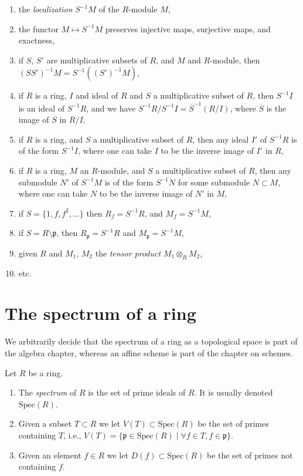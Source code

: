\begin{enumerate}
\label{localization-localization}
\item the {\it localization} $S^{-1}M$ of the $R$-module $M$,
\label{localization-module}
\item the functor $M \mapsto S^{-1}M$ preserves injective maps,
surjective maps, and exactness,
\label{localization-exact}
\item if $S$, $S'$ are multiplicative subsets of $R$,
and $M$ and $R$-module, then $(SS')^{-1}M =
S^{-1}((S')^{-1}M)$,
\label{localization-localization-module}
\item if $R$ is a ring, $I$ and ideal of $R$ and $S$ a multiplicative
subset of $R$, then $S^{-1}I$ is an ideal of $S^{-1}R$, and we have
$S^{-1}R/S^{-1}I = \overline{S}^{-1}(R/I)$, where $\overline{S}$
is the image of $S$ in $R/I$,
\label{localize-ideal}
\item if $R$ is a ring, and $S$ a multiplicative
subset of $R$, then any ideal $I'$ of $S^{-1}R$ is
of the form $S^{-1}I$, where one can take $I$ to be
the inverse image of $I'$ in $R$,
\label{ideal-in-localization}
\item if $R$ is a ring, $M$ an $R$-module, and $S$ a multiplicative
subset of $R$, then any submodule $N'$ of $S^{-1}M$ is of the form
$S^{-1}N$ for some submodule $N \subset M$, where
one can take $N$ to be the inverse image of $N'$ in $M$,
\label{submodule-in-localization}
\item if $S = \{1, f, f^2,\ldots\}$ then $R_f = S^{-1}R$, and
$M_f = S^{-1}M$,
\label{localiza-f}
\item if $S = R \setminus \mathfrak p$, then $R_{\mathfrak p} = S^{-1}R$
and $M_{\mathfrak p} = S^{-1}M$,
\label{localize-p}
\item given $R$ and $M_1$, $M_2$ the {\it tensor product} 
$M_1 \otimes_R M_2$,
\item etc.
\end{enumerate}

\section{The spectrum of a ring}
\label{section-spectrum-ring}

\noindent
We arbitrarily decide that the spectrum of a ring as a topological space
is part of the algebra chapter, whereas an affine scheme is part of the
chapter on schemes.

\begin{definition}
\label{definition-spectrum-ring}
Let $R$ be a ring.
\begin{enumerate}
\item The {\it spectrum} of $R$ is the set of prime ideals of $R$.
It is usually denoted $\text{Spec}(R)$.
\item Given a subset $T \subset R$ we let $V(T) \subset \text{Spec}(R)$
be the set of primes containing $T$, i.e., $V(T) = \{ \mathfrak p \in
\text{Spec}(R) \mid \forall f\in T, f\in \mathfrak p\}$.
\item Given an element $f \in R$ we let $D(f) \subset \text{Spec}(R)$
be the set of primes not containing $f$.
\end{enumerate}
\end{definition}

